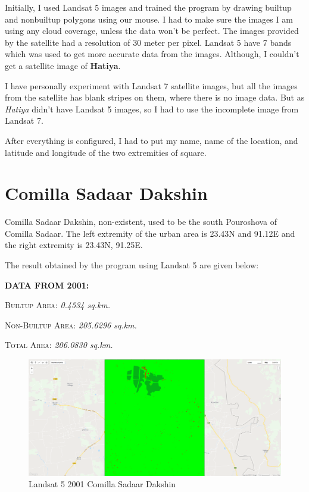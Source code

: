 \documentclass{article}
\begin{document}
Initially, I used Landsat 5 images and trained the program by drawing builtup and nonbuiltup polygons using our mouse. I had to make sure the images I am using any cloud coverage, unless the data won't be perfect. The images provided by the satellite had a resolution of 30 meter per pixel. Landsat 5 have 7 bands which was used to get more accurate data from the images. Although, I couldn't get a satellite image of \textbf{Hatiya}.

I have personally experiment with Landsat 7 satellite images, but all the images from the satellite has blank stripes on them, where there is no image data. But as \textit{Hatiya} didn't have Landsat 5 images, so I had to use the incomplete image from Landsat 7.

After everything is configured, I had to put my name, name of the location, and latitude and longitude of the two extremities of square.

\section{Comilla Sadaar Dakshin}
Comilla Sadaar Dakshin, non-existent, used to be the south Pouroshova of Comilla Sadaar. The left extremity of the urban area is 23.43\degree N and 91.12\degree E and the right extremity is 23.43\degree N, 91.25\degree E.

The result obtained by the program using \textsf{Landsat 5} are given below:

\textbf{DATA FROM 2001:}

\textsc{Builtup Area: } \textit{0.4534 sq.km.}

\textsc{Non-Builtup Area: } \textit{205.6296 sq.km.}

\textsc{Total Area: } \textit{206.0830 sq.km.}

\begin{figure}[H]
\centering
\includegraphics[width=\textwidth]{2001_ComillaSadaarDakshin}
\caption{Landsat 5 2001 Comilla Sadaar Dakshin}
\end{figure}
\end{document}
